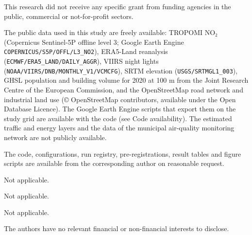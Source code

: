 \documentclass[pdflatex,sn-basic]{sn-jnl}
\begin{document}
This research did not receive any specific grant from funding agencies in the public, commercial or not-for-profit sectors.

The public data used in this study are freely available: TROPOMI NO₂ (Copernicus Sentinel-5P offline level 3; Google Earth Engine \nolinkurl{COPERNICUS/S5P/OFFL/L3_NO2}), ERA5-Land reanalysis (\nolinkurl{ECMWF/ERA5_LAND/DAILY_AGGR}), VIIRS night lights (\nolinkurl{NOAA/VIIRS/DNB/MONTHLY_V1/VCMCFG}), SRTM elevation (\nolinkurl{USGS/SRTMGL1_003}), GHSL population and building volume for 2020 at 100 m from the Joint Research Centre of the European Commission, and the OpenStreetMap road network and industrial land use (© OpenStreetMap contributors, available under the Open Database Licence). The Google Earth Engine scripts that export them on the study grid are available with the code (see Code availability). The estimated traffic and energy layers and the data of the municipal air-quality monitoring network are not publicly available.

The code, configurations, run registry, pre-registrations, result tables and figure scripts are available from the corresponding author on reasonable request.

Not applicable.

Not applicable.

Not applicable.

The authors have no relevant financial or non-financial interests to disclose.


\end{document}
